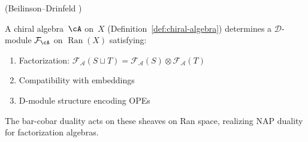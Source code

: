 \begin{theorem}\label{thm:chiral-ran}
\textup{(Beilinson--Drinfeld \cite[Chapter~3]{BD04})}

A chiral algebra~$\cA$ on~$X$
(Definition~\ref{def:chiral-algebra}) determines a
$\mathcal{D}$-module $\mathcal{F}_{\cA}$ on
$\operatorname{Ran}(X)$ satisfying:
\begin{enumerate}
\item Factorization: $\mathcal{F}_{\mathcal{A}}(S \sqcup T) = \mathcal{F}_{\mathcal{A}}(S) \otimes \mathcal{F}_{\mathcal{A}}(T)$
\item Compatibility with embeddings
\item D-module structure encoding OPEs
\end{enumerate}

The bar-cobar duality acts on these sheaves on Ran space, realizing NAP duality for factorization algebras.
\end{theorem}


